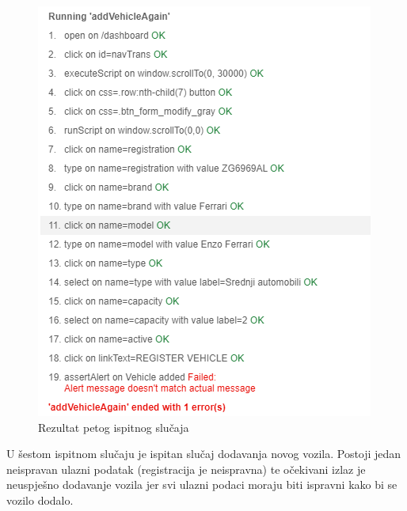 			\begin{figure}[H]
				\centering
				\includegraphics[width=\textwidth]{"slike/Selenium/transport testovi/addVehicleAgain_rezultat.png"}
				\caption{Rezultat petog ispitnog slučaja}
				\label{fig: addVehicleAgain_rezultat}
			\end{figure}
			\eject
			U šestom ispitnom slučaju je ispitan slučaj dodavanja novog vozila. Postoji jedan neispravan ulazni podatak (registracija je neispravna) te očekivani izlaz je neuspješno dodavanje vozila jer svi ulazni podaci moraju biti ispravni kako bi se vozilo dodalo.
